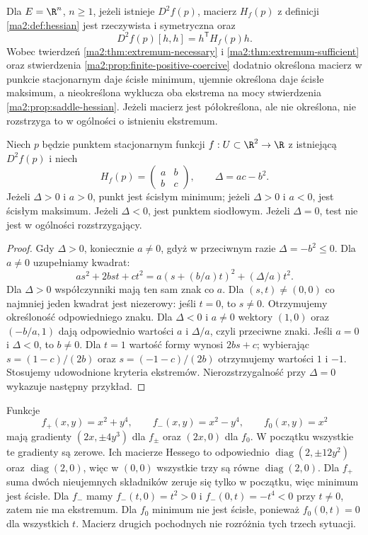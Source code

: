 Dla $E=\R^n$, $n\ge1$, jeżeli istnieje $D^2f(p)$,
macierz $H_f(p)$ z definicji \ref{ma2:def:hessian}
jest rzeczywista i symetryczna oraz
\[
 D^2f(p)[h,h]=h^{\mathsf T}H_f(p)h .
\]
Wobec twierdzeń \ref{ma2:thm:extremum-necessary}
i \ref{ma2:thm:extremum-sufficient} oraz
stwierdzenia \ref{ma2:prop:finite-positive-coercive}
dodatnio określona macierz w punkcie stacjonarnym daje
ścisłe minimum, ujemnie określona daje ścisłe maksimum,
a nieokreślona wyklucza oba ekstrema na mocy
stwierdzenia \ref{ma2:prop:saddle-hessian}.
Jeżeli macierz jest półokreślona, ale nie określona, nie rozstrzyga
to w ogólności o istnieniu ekstremum.

\begin{stwierdzenie}
\label{ma2:prop:hessian-two-dim}
Niech $p$ będzie punktem stacjonarnym funkcji
$f:U\subset\R^2\to\R$ z istniejącą $D^2f(p)$ i niech
\[
 H_f(p)=\begin{pmatrix}a&b\\b&c\end{pmatrix},\qquad
 \Delta=ac-b^2.
\]
Jeżeli $\Delta>0$ i $a>0$, punkt jest ścisłym minimum;
jeżeli $\Delta>0$ i $a<0$, jest ścisłym maksimum.
Jeżeli $\Delta<0$, jest punktem siodłowym.
Jeżeli $\Delta=0$, test nie jest w ogólności rozstrzygający.
\end{stwierdzenie}
\begin{proof}
Gdy $\Delta>0$, koniecznie $a\ne0$, gdyż w przeciwnym
razie $\Delta=-b^2\le0$. Dla $a\ne0$ uzupełniamy kwadrat:
\[
 a s^2+2bst+ct^2
 =a(s+(b/a)t)^2+(\Delta/a)t^2.
\]
Dla $\Delta>0$ współczynniki mają ten sam znak
co $a$. Dla $(s,t)\ne(0,0)$ co najmniej jeden kwadrat
jest niezerowy: jeśli $t=0$, to $s\ne0$.
Otrzymujemy określoność odpowiedniego znaku.
Dla $\Delta<0$ i $a\ne0$ wektory $(1,0)$ oraz
$(-b/a,1)$ dają odpowiednio wartości $a$ i $\Delta/a$,
czyli przeciwne znaki. Jeśli $a=0$ i $\Delta<0$,
to $b\ne0$. Dla $t=1$ wartość formy wynosi $2bs+c$;
wybierając $s=(1-c)/(2b)$ oraz $s=(-1-c)/(2b)$
otrzymujemy wartości $1$ i $-1$.
Stosujemy udowodnione kryteria ekstremów.
Nierozstrzygalność przy $\Delta=0$ wykazuje
następny przykład.
\end{proof}

\begin{przyklad}
\label{ma2:ex:degenerate-hessian}
Funkcje
\[
 f_+(x,y)=x^2+y^4,\qquad
 f_-(x,y)=x^2-y^4,\qquad f_0(x,y)=x^2
\]
mają gradienty $(2x,\pm4y^3)$ dla $f_\pm$ oraz
$(2x,0)$ dla $f_0$. W początku wszystkie te gradienty
są zerowe. Ich macierze Hessego to odpowiednio
$\operatorname{diag}(2,\pm12y^2)$ oraz
$\operatorname{diag}(2,0)$, więc w $(0,0)$ wszystkie
trzy są równe $\operatorname{diag}(2,0)$.
Dla $f_+$ suma dwóch nieujemnych składników zeruje
się tylko w początku, więc minimum jest ścisłe.
Dla $f_-$ mamy $f_-(t,0)=t^2>0$ i
$f_-(0,t)=-t^4<0$ przy $t\ne0$, zatem nie ma ekstremum.
Dla $f_0$ minimum nie jest ścisłe, ponieważ
$f_0(0,t)=0$ dla wszystkich $t$. Macierz drugich
pochodnych nie rozróżnia tych trzech sytuacji.
\end{przyklad}

